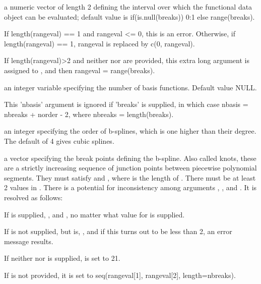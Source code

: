 \documentclass{article}
\begin{document}
\begin{Arguments}
\begin{ldescription}
\item[\code{rangeval}] a numeric vector of length 2 defining the interval over
which the functional data object can be evaluated;  default value
is if(is.null(breaks)) 0:1 else range(breaks).  

If length(rangeval) == 1 and rangeval <= 0, this is an error.
Otherwise, if length(rangeval) == 1, rangeval is replaced by c(0,
rangeval).  

If length(rangeval)>2 and neither  nor 
are provided, this extra long  argument is assigned
to , and then rangeval = range(breaks).  

\item[\code{nbasis}] an integer variable specifying the number of basis functions.
Default value NULL.

This 'nbasis' argument is ignored if 'breaks' is supplied, in which
case nbasis = nbreaks + norder - 2, where nbreaks = length(breaks).

\item[\code{norder}] an integer specifying the order of b-splines, which is one higher
than their degree. The default of 4 gives cubic splines.

\item[\code{breaks}] a vector specifying the break points defining the b-spline.
Also called knots, these are a strictly increasing sequence
of junction points between piecewise polynomial segments.
They must satisfy  and
, where  is the 
length of .  There must be at least 2 values in
.  There is a potential for inconsistency among
arguments , , and .  It is
resolved as follows:

If  is supplied, , and
, no matter what value for
 is supplied. 

If  is not supplied, but  is,
, and if this turns out to be
less than 2, an error message results.

If neither  nor  is supplied,
 is set to 21.

If  is not provided, it is set to seq(rangeval[1],
rangeval[2], length=nbreaks).  


\end{ldescription}
\end{Arguments}
\end{document}

